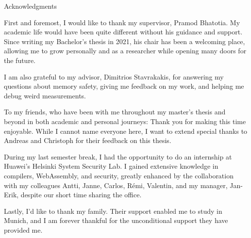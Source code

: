 \thispagestyle{empty}

\vspace*{20mm}

\begin{center}
{ Acknowledgments}
\end{center}

\vspace{10mm}

First and foremost, I would like to thank my supervisor, Pramod Bhatotia.
My academic life would have been quite different without his guidance and support.
Since writing my Bachelor's thesis in 2021, his chair has been a welcoming place, allowing me to grow personally and as a researcher while opening many doors for the future.

\noindent
I am also grateful to my advisor, Dimitrios Stavrakakis, for answering my questions about memory safety, giving me feedback on my work, and helping me debug weird measurements.


To my friends, who have been with me throughout my master's thesis and beyond in both academic and personal journeys:
Thank you for making this time enjoyable.
While I cannot name everyone here, I want to extend special thanks to Andreas and Christoph for their feedback on this thesis.

During my last semester break, I had the opportunity to do an internship at Huawei's Helsinki System Security Lab.
I gained extensive knowledge in compilers, WebAssembly, and security, greatly enhanced by the collaboration with my colleagues Antti, Janne, Carlos, Rémi, Valentin, and my manager, Jan-Erik, despite our short time sharing the office.

Lastly, I'd like to thank my family.
Their support enabled me to study in Munich, and I am forever thankful for the unconditional support they have provided me.

\cleardoublepage{}
